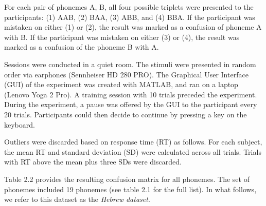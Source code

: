 For each pair of phonemes {A, B}, all four possible triplets were presented to the participants: (1) AAB, (2) BAA, (3) ABB, and (4) BBA. If the participant was mistaken on either (1) or (2), the result was marked as a confusion of phoneme A with B. If the participant was mistaken on either (3) or (4), the result was marked as a confusion of the phoneme B with A. 

Sessions were conducted in a quiet room. The stimuli were presented in random order via earphones (Sennheiser HD 280 PRO). The Graphical User Interface (GUI) of the experiment was created with MATLAB, and ran on a laptop (Lenovo Yoga 2 Pro). A training session with 10 trials preceded the experiment. During the experiment, a pause was offered by the GUI to the participant every 20 trials. Participants could then decide to continue by pressing a key on the keyboard.

Outliers were discarded based on response time (RT) as follows. For each subject, the mean RT and standard deviation (SD) were calculated across all trials. Trials with RT above the mean plus three SDs were discarded.

Table 2.2 provides the resulting confusion matrix for all phonemes. The set of phonemes included 19 phonemes (see table 2.1 for the full list). In what follows, we refer to this dataset as the \textit{Hebrew dataset}.

